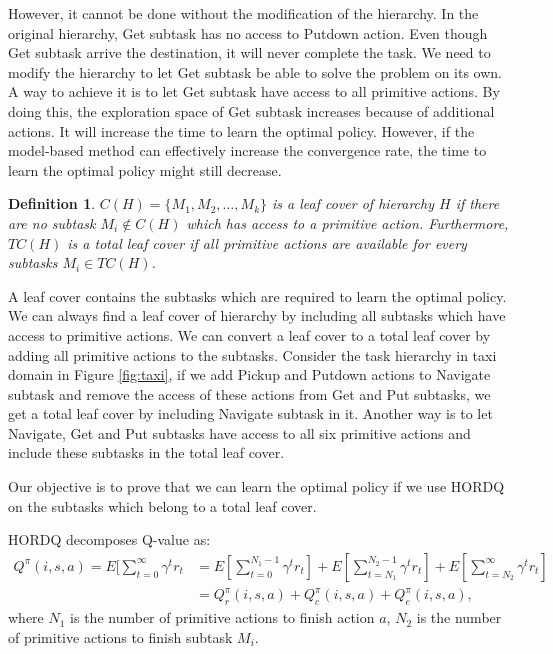 \documentclass{article} %
\newtheorem{definition}{Definition}
\begin{document}
However, it cannot be done without the modification of the hierarchy. In the original hierarchy, 
Get subtask has no access to Putdown action. Even though Get subtask arrive the destination,
it will never complete the task. We need to modify the hierarchy to let Get subtask be
able to solve the problem on its own. A way to achieve it is to let Get subtask have access
to all primitive actions. By doing this, the exploration space of Get subtask increases
because of additional actions. It will increase 
the time to learn the optimal policy. However, if the model-based method can effectively increase
the convergence rate, the time to learn the optimal policy might still decrease.


\begin{definition}
    $C(H) = \{M_1, M_2, \dots, M_k\}$ is a leaf cover of hierarchy $H$ 
    if there are no subtask $M_i \notin C(H)$ which has access to a primitive action.
    Furthermore, $TC(H)$ is a total leaf cover if all primitive actions are available for every 
    subtasks $M_i \in TC(H)$.
\end{definition}

A leaf cover contains the subtasks which are required to learn the optimal policy.
We can always find a leaf cover of hierarchy by including all subtasks which have access
to primitive actions. We can convert a leaf cover to a total leaf cover by 
adding all primitive actions to the subtasks. 
Consider the task hierarchy in taxi domain in Figure \ref{fig:taxi},
if we add Pickup and Putdown actions to Navigate subtask and remove the access of these actions from Get and Put subtasks,
we get a total leaf cover by including Navigate subtask in it. Another way is to let Navigate, Get and Put subtasks
have access to all six primitive actions and include these subtasks in the total leaf cover. 

Our objective is to prove that we can learn the optimal policy if we use HORDQ \cite{HORDQ} on the subtasks which 
belong to a total leaf cover.

HORDQ decomposes Q-value as:
\begin{align}
    \label{eq:HordQ}
    Q^{\pi}(i, s, a) = E[\sum_{t=0}^{\infty}\gamma^t r_t &= E[\sum_{t=0}^{N_1 - 1}\gamma^t r_t] + E[\sum_{t=N_1}^{N_2 - 1}\gamma^t r_t] + E[\sum_{t=N_2}^{\infty}\gamma^t r_t]\\
                    &= Q_r^{\pi}(i, s, a) + Q_c^{\pi}(i, s, a) + Q_e^{\pi}(i, s, a),
\end{align}
where $N_1$ is the number of primitive actions to finish action $a$, $N_2$ is the number of primitive actions 
to finish subtask $M_i$. 
\end{document}

